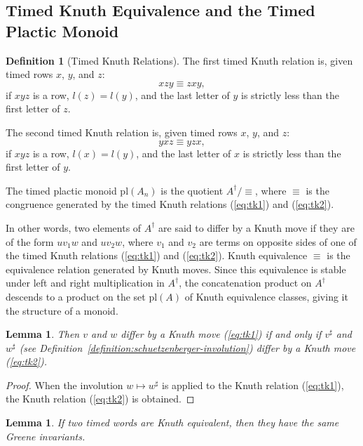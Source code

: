 \documentclass[10pt]{amsproc}
\newtheorem{lemma}[theorem]{Lemma}
\theoremstyle{definition}
\newtheorem{definition}[theorem]{Definition}
\theoremstyle{remark}
\newcommand{\pl}{\mathrm{pl}}
\begin{document}
\subsection{Timed Knuth Equivalence and the Timed Plactic Monoid}
\begin{definition}
  [Timed Knuth Relations]
  \label{sec:timed-knuth-equiv}
  The first timed Knuth relation is, given timed rows $x$, $y$, and $z$:
  \begin{equation}
    \tag{$\kappa_1$}
    \label{eq:tk1}
    xzy \equiv zxy,
  \end{equation}
  if $xyz$ is a row, $l(z) = l(y)$, and the last letter of $y$ is strictly less than the first letter of $z$.

  The second timed Knuth relation is, given timed rows $x$, $y$, and $z$:
  \begin{equation}
    \tag{$\kappa_2$}
    \label{eq:tk2}
    yxz \equiv yzx,
  \end{equation}
  if $xyz$ is a row, $l(x)=l(y)$, and the last letter of $x$ is strictly less than the first letter of $y$.

  The timed plactic monoid $\pl(A_n)$ is the quotient $A^\dagger/\equiv$, where $\equiv$ is the congruence generated by the timed Knuth relations (\ref{eq:tk1}) and (\ref{eq:tk2}).
\end{definition}
In other words, two elements of $A^\dagger$ are said to differ by a Knuth move if they are of the form $uv_1w$ and $uv_2w$, where $v_1$ and $v_2$ are terms on opposite sides of one of the timed Knuth relations (\ref{eq:tk1}) and (\ref{eq:tk2}).
Knuth equivalence $\equiv$ is the equivalence relation generated by Knuth moves.
Since this equivalence is stable under left and right multiplication in $A^\dagger$, the concatenation product on $A^\dagger$ descends to a product on the set $\pl(A)$ of Knuth equivalence classes, giving it the structure of a monoid.
\begin{lemma}
  \label{lemma:sharp-moves}
  Then $v$ and $w$ differ by a Knuth move (\ref{eq:tk1}) if and only if $v^\sharp$ and $w^\sharp$ (see Definition~\ref{definition:schuetzenberger-involution}) differ by a Knuth move (\ref{eq:tk2}).
\end{lemma}
\begin{proof}
  When the involution $w\mapsto w^\sharp$ is applied to the Knuth relation (\ref{eq:tk1}), the Knuth relation (\ref{eq:tk2}) is obtained.
\end{proof}
\begin{lemma}
  \label{lemma:Knuth-Greene}
  If two timed words are Knuth equivalent, then they have the same Greene invariants.
\end{lemma}
\end{document}
